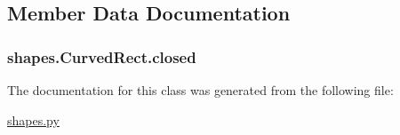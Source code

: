 \subsection{Member Data Documentation}
\hypertarget{classshapes_1_1_curved_rect_a8c94b771161645f1ad000e5c4199d463}{}
\subsubsection[{closed}]{\setlength{\rightskip}{0pt plus 5cm}shapes.\+Curved\+Rect.\+closed}\label{classshapes_1_1_curved_rect_a8c94b771161645f1ad000e5c4199d463}


The documentation for this class was generated from the following file\+:\begin{DoxyCompactItemize}
\item 
\hyperlink{shapes_8py}{shapes.\+py}\end{DoxyCompactItemize}

